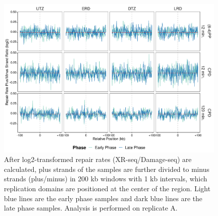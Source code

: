 \begin{figure}[H]
\begin{center}
\includegraphics[width=\textwidth]{Chapters/7_appendix/figures/supfig32}
\caption[Repair rate plus/minus phase ratio of replication domains in 200 kb (replicate A).]{After log2-transformed repair rates (XR-seq/Damage-seq) are calculated, plus strands of the samples are further divided to minus strands (plus/minus) in 200 kb windows with 1 kb intervals, which replication domains are positioned at the center of the region. Light blue lines are the early phase samples and dark blue lines are the late phase samples. Analysis is performed on replicate A.}
\label{supfig:rrpm200repdomainA}
\end{center}
\end{figure}

